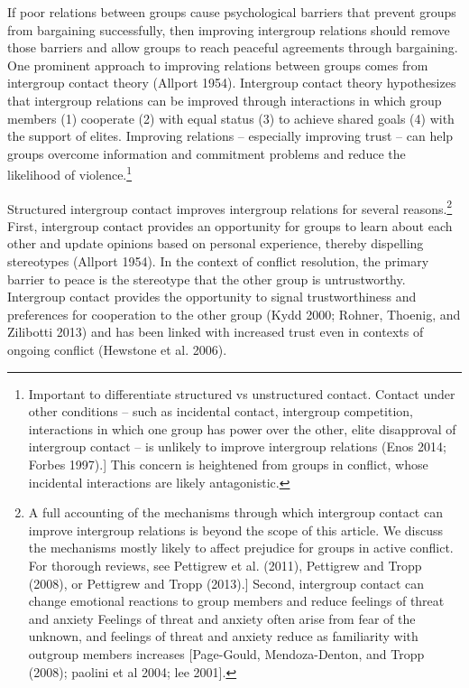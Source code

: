 \documentclass[11pt]{article}
\begin{document}
If poor relations between groups cause psychological barriers that
prevent groups from bargaining successfully, then improving intergroup
relations should remove those barriers and allow groups to reach
peaceful agreements through bargaining. One prominent approach to
improving relations between groups comes from intergroup contact theory
(Allport 1954). Intergroup contact theory hypothesizes that intergroup
relations can be improved through interactions in which group members
(1) cooperate (2) with equal status (3) to achieve shared goals (4) with
the support of elites. Improving relations -- especially improving trust
-- can help groups overcome information and commitment problems and
reduce the likelihood of violence.\footnote{Important to differentiate
  structured vs unstructured contact. Contact under other conditions --
  such as incidental contact, intergroup competition, interactions in
  which one group has power over the other, elite disapproval of
  intergroup contact -- is unlikely to improve intergroup relations
  (Enos 2014; Forbes 1997).{]} This concern is heightened from groups in
  conflict, whose incidental interactions are likely antagonistic.}

Structured intergroup contact improves intergroup relations for several
reasons.\footnote{A full accounting of the mechanisms through which
  intergroup contact can improve intergroup relations is beyond the
  scope of this article. We discuss the mechanisms mostly likely to
  affect prejudice for groups in active conflict. For thorough reviews,
  see Pettigrew et al. (2011), Pettigrew and Tropp (2008), or Pettigrew
  and Tropp (2013).{]} Second, intergroup contact can change emotional
  reactions to group members and reduce feelings of threat and anxiety
  Feelings of threat and anxiety often arise from fear of the unknown,
  and feelings of threat and anxiety reduce as familiarity with outgroup
  members increases {[}Page-Gould, Mendoza-Denton, and Tropp (2008);
  paolini et al 2004; lee 2001{]}. } First, intergroup contact provides
an opportunity for groups to learn about each other and update opinions
based on personal experience, thereby dispelling stereotypes (Allport
1954). In the context of conflict resolution, the primary barrier to
peace is the stereotype that the other group is untrustworthy.
Intergroup contact provides the opportunity to signal trustworthiness
and preferences for cooperation to the other group (Kydd 2000; Rohner,
Thoenig, and Zilibotti 2013) and has been linked with increased trust
even in contexts of ongoing conflict (Hewstone et al. 2006).
\end{document}
